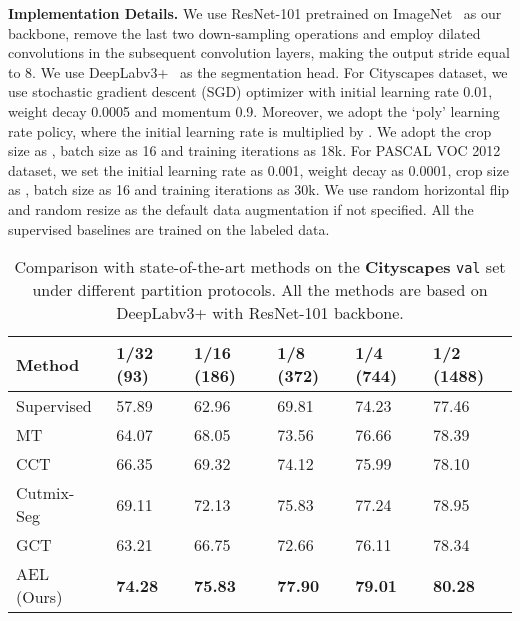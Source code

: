\noindent\textbf{Implementation Details. }
We use ResNet-101 pretrained on ImageNet~\cite{krizhevsky2012imagenet} as our backbone, remove the last two down-sampling operations and employ dilated convolutions in the subsequent convolution layers, making the output stride equal to 8. We use DeepLabv3+~\cite{chen2018encoder} as the segmentation head. For Cityscapes dataset, we use stochastic gradient descent (SGD) optimizer with initial learning rate 0.01, weight decay 0.0005 and momentum 0.9. Moreover, we adopt the `poly' learning rate policy, where the initial learning rate is multiplied by . We adopt the crop size as , batch size as 16 and training iterations as 18k. For PASCAL VOC 2012 dataset, we set the initial learning rate as 0.001, weight decay as 0.0001, crop size as , batch size as 16 and training iterations as 30k. We use random horizontal flip and random resize as the default data augmentation if not specified. All the supervised baselines are trained on the labeled data. 


\begin{table*}[t]
\renewcommand\arraystretch{1.1}
\begin{center}
\caption{Comparison with state-of-the-art methods on the \textbf{Cityscapes} \texttt{val} set under different partition protocols. All the methods are based on DeepLabv3+ with ResNet-101 backbone.}
\label{citysota}
\begin{tabularx}{14cm}{p{2.5cm}|X<{\centering}| X<{\centering}| X<{\centering} | X<{\centering}| X<{\centering}}
\toprule
Method  & 1/32 (93) & 1/16 (186) & 1/8 (372) & 1/4 (744) & 1/2 (1488) \\
\midrule
Supervised  & 57.89 & 62.96 & 69.81 & 74.23 & 77.46 \\
\midrule
MT~\cite{TarvainenV17}    &  64.07 & 68.05 & 73.56 & 76.66 & 78.39\\
CCT~\cite{OualiHT20}   & 66.35 & 69.32 & 74.12 & 75.99 & 78.10 \\
Cutmix-Seg~\cite{FrenchLAMF20}    & 69.11 & 72.13 & 75.83 & 77.24  & 78.95 \\
GCT~\cite{KeQLYL20}     & 63.21  & 66.75 & 72.66 & 76.11 & 78.34\\
\midrule
AEL (Ours)    & \textbf{74.28} & \textbf{75.83} & \textbf{77.90} & \textbf{79.01}  & \textbf{80.28}\\
\bottomrule
\end{tabularx}
\end{center}
\end{table*}

